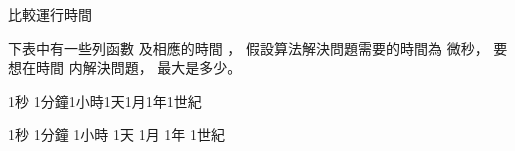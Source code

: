\startsubject[
  title={Problems},
]
\startPROBLEM
比較運行時間

下表中有一些列函數  及相應的時間 ，
假設算法解決問題需要的時間為  微秒，
要想在時間  内解決問題，
 最大是多少。

\bTABLE[align=center]
\bTR \bTD \eTD \bTD 1秒 \eTD \bTD 1分鐘\eTD \bTD 1小時\eTD \bTD 1天\eTD \bTD 1月\eTD \bTD 1年\eTD \bTD 1世紀\eTD \eTR
\bTR \bTD {}   \eTD \bTD \eTD \bTD \eTD \bTD \eTD \bTD \eTD \bTD \eTD \bTD \eTD \bTD \eTD \eTR
\bTR \bTD {}\eTD \bTD \eTD \bTD \eTD \bTD \eTD \bTD \eTD \bTD \eTD \bTD \eTD \bTD \eTD \eTR
\bTR \bTD {}       \eTD \bTD \eTD \bTD \eTD \bTD \eTD \bTD \eTD \bTD \eTD \bTD \eTD \bTD \eTD \eTR
\bTR \bTD {}  \eTD \bTD \eTD \bTD \eTD \bTD \eTD \bTD \eTD \bTD \eTD \bTD \eTD \bTD \eTD \eTR
\bTR \bTD {}     \eTD \bTD \eTD \bTD \eTD \bTD \eTD \bTD \eTD \bTD \eTD \bTD \eTD \bTD \eTD \eTR
\bTR \bTD {}     \eTD \bTD \eTD \bTD \eTD \bTD \eTD \bTD \eTD \bTD \eTD \bTD \eTD \bTD \eTD \eTR
\bTR \bTD {}     \eTD \bTD \eTD \bTD \eTD \bTD \eTD \bTD \eTD \bTD \eTD \bTD \eTD \bTD \eTD \eTR
\bTR \bTD {}      \eTD \bTD \eTD \bTD \eTD \bTD \eTD \bTD \eTD \bTD \eTD \bTD \eTD \bTD \eTD \eTR
\eTABLE
\stopPROBLEM

\startANSWER
\bTABLE[align=center]
\bTR \bTD \eTD
  \bTD 1秒 \eTD
  \bTD 1分鐘\eTD
  \bTD 1小時\eTD
  \bTD 1天\eTD
  \bTD 1月\eTD
  \bTD 1年\eTD
  \bTD 1世紀\eTD \eTR
\bTR \bTD \eTD
  \bTD {}\eTD
  \bTD {}\eTD
  \bTD {}\eTD
  \bTD {}\eTD
  \bTD {}\eTD
  \bTD {}\eTD
  \bTD {}\eTD \eTR
\bTR \bTD {}\eTD
  \bTD {}\eTD
  \bTD {}\eTD
  \bTD {}\eTD
  \bTD {}\eTD
  \bTD {}\eTD
  \bTD {}\eTD
  \bTD {}\eTD \eTR
\bTR \bTD {}\eTD
  \bTD \eTD
  \bTD \eTD
  \bTD \eTD
  \bTD \eTD
  \bTD \eTD
  \bTD \eTD
  \bTD \eTD \eTR
\bTR \bTD {}\eTD
  \bTD \eTD
  \bTD \eTD
  \bTD \eTD
  \bTD \eTD
  \bTD \eTD
  \bTD \eTD
  \bTD \eTD \eTR
\bTR \bTD {}\eTD
  \bTD \eTD
  \bTD \eTD
  \bTD \eTD
  \bTD \eTD
  \bTD \eTD
  \bTD \eTD
  \bTD \eTD \eTR
\bTR \bTD {}\eTD
  \bTD \eTD
  \bTD \eTD
  \bTD \eTD
  \bTD \eTD
  \bTD \eTD
  \bTD \eTD
  \bTD \eTD \eTR
\bTR \bTD {}\eTD
  \bTD \eTD
  \bTD \eTD
  \bTD \eTD
  \bTD \eTD
  \bTD \eTD
  \bTD \eTD
  \bTD \eTD \eTR
\bTR \bTD {}\eTD
  \bTD \eTD
  \bTD \eTD
  \bTD \eTD
  \bTD \eTD
  \bTD \eTD
  \bTD \eTD
  \bTD \eTD \eTR
\bTR \bTD {}\eTD
  \bTD \eTD
  \bTD \eTD
  \bTD \eTD
  \bTD \eTD
  \bTD \eTD
  \bTD \eTD
  \bTD \eTD \eTR
\eTABLE
\stopANSWER

\stopsubject
